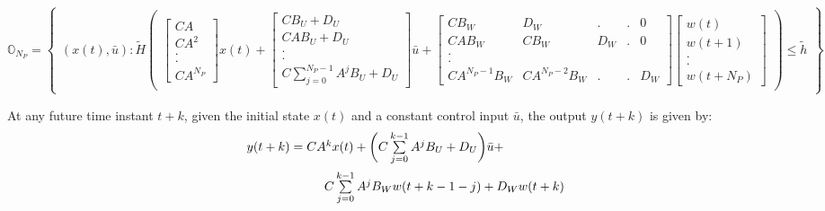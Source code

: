 \documentclass[letterpaper, 10 pt, conference]{ieeeconf}  %
\begin{document}
  \\
  \begin{table}[t]
  	\begin{equation}
  	\mathbb{O}_{N_P}= \begin{Bmatrix}
  	(x(t),\bar{u}):
  	\tilde{H}
  	\begin{pmatrix}
  	\begin{bmatrix}
  	CA \\ CA^2 \\ . \\ . \\ CA^{N_P}
  	\end{bmatrix}x(t) +
  	\begin{bmatrix}
  	CB_U+D_U \\ CAB_U+D_U \\ . \\ . \\ C\sum\limits_{j=0}^{N_P-1}A^{j}B_U + D_{U}
  	\end{bmatrix}\bar{u} + 
  	\begin{bmatrix}
  	CB_W & D_W & . & .  & 0 \\ CAB_W & CB_W & D_W & . & 0 \\ . \\ . \\ CA^{N_P-1}B_W & CA^{N_P-2}B_W & . & . & D_W
  	\end{bmatrix}
  	\begin{bmatrix}
  	w(t) \\ w(t+1) \\ . \\ . \\ w(t+N_P)
  	\end{bmatrix} 
  	\end{pmatrix}
  	\leq
  	\tilde{h}
  	\end{Bmatrix}
  	\label{full_ONP}
  	\end{equation}
  \end{table}
  At any future time instant $t+k$, given the initial state $x(t)$ and a constant control input $\bar{u}$, the output $y(t+k)$ is given by:
  	\begin{equation}
  	\hspace{-30pt}
  	\begin{aligned}
  	\begin{matrix}
  	y(t+k) = CA^{k}x(t) + \bigg( C\sum\limits_{j=0}^{k-1}A^{j}B_U + D_{U} \bigg)\bar{u} + \vspace{5pt}\\  \hspace{110pt} C\sum\limits_{j=0}^{k-1}A^jB_Ww(t+k-1-j) + D_{W} w(t+k)
  	\end{matrix}
  	\end{aligned}
  	\label{elongform}
  	\end{equation}
\end{document}
